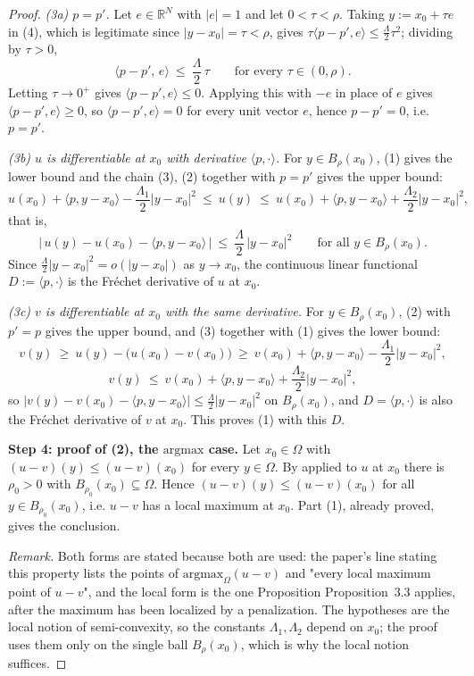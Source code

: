 \begin{proof}
\emph{(3a) $p=p'$.} Let $e\in\mathbb R^{N}$ with $|e|=1$ and let $0<\tau<\rho$. Taking
$y:=x_0+\tau e$ in (4), which is legitimate since $|y-x_0|=\tau<\rho$, gives
$\tau\langle p-p',e\rangle\le\tfrac{\Lambda}{2}\tau^{2}$; dividing by $\tau>0$,
\[
 \langle p-p',\,e\rangle\ \le\ \frac{\Lambda}{2}\,\tau\qquad\text{for every }\tau\in(0,\rho).
\]
Letting $\tau\to0^{+}$ gives $\langle p-p',e\rangle\le0$. Applying this with $-e$ in place of
$e$ gives $\langle p-p',e\rangle\ge0$, so $\langle p-p',e\rangle=0$ for every unit vector
$e$, hence $p-p'=0$, i.e. $p=p'$.

\emph{(3b) $u$ is differentiable at $x_0$ with derivative $\langle p,\cdot\rangle$.} For
$y\in B_\rho(x_0)$, (1) gives the lower bound and the chain (3), (2) together with $p=p'$
gives the upper bound:
\[
 u(x_0)+\langle p,y-x_0\rangle-\frac{\Lambda_1}{2}|y-x_0|^{2}
 \ \le\ u(y)\ \le\ u(x_0)+\langle p,y-x_0\rangle+\frac{\Lambda_2}{2}|y-x_0|^{2},
\]
that is,
\[
 \big|\,u(y)-u(x_0)-\langle p,y-x_0\rangle\,\big|\ \le\ \frac{\Lambda}{2}\,|y-x_0|^{2}
 \qquad\text{for all }y\in B_\rho(x_0).
\]
Since $\tfrac{\Lambda}{2}|y-x_0|^{2}=o(|y-x_0|)$ as $y\to x_0$, the continuous linear
functional $D:=\langle p,\cdot\rangle$ is the Fr\'echet derivative of $u$ at $x_0$.

\emph{(3c) $v$ is differentiable at $x_0$ with the same derivative.} For $y\in B_\rho(x_0)$,
(2) with $p'=p$ gives the upper bound, and (3) together with (1) gives the lower bound:
\[
 v(y)\ \ge\ u(y)-\big(u(x_0)-v(x_0)\big)
   \ \ge\ v(x_0)+\langle p,y-x_0\rangle-\frac{\Lambda_1}{2}|y-x_0|^{2},
\]
\[
 v(y)\ \le\ v(x_0)+\langle p,y-x_0\rangle+\frac{\Lambda_2}{2}|y-x_0|^{2} ,
\]
so $\big|v(y)-v(x_0)-\langle p,y-x_0\rangle\big|\le\tfrac{\Lambda}{2}|y-x_0|^{2}$ on
$B_\rho(x_0)$, and $D=\langle p,\cdot\rangle$ is also the Fr\'echet derivative of $v$ at
$x_0$. This proves (1) with this $D$.

\medskip\noindent\textbf{Step 4: proof of (2), the $\mathrm{argmax}$ case.} Let
$x_0\in\Omega$ with $(u-v)(y)\le(u-v)(x_0)$ for every $y\in\Omega$. By
 applied to $u$ at $x_0$ there is $\rho_0>0$ with
$B_{\rho_0}(x_0)\subseteq\Omega$. Hence $(u-v)(y)\le(u-v)(x_0)$ for all
$y\in B_{\rho_0}(x_0)$, i.e. $u-v$ has a local maximum at $x_0$. Part (1), already proved,
gives the conclusion.

\medskip\noindent\emph{Remark.} Both forms are stated because both are used: the paper's
line stating this property lists the points of $\mathrm{argmax}_\Omega(u-v)$ and "every local
maximum point of $u-v$", and the local form is the one Proposition Proposition~3.3 applies, after
the maximum has been localized by a penalization. The hypotheses are the local notion of
semi-convexity, so the constants $\Lambda_1,\Lambda_2$ depend on $x_0$; the proof uses them
only on the single ball $B_\rho(x_0)$, which is why the local notion suffices.
\end{proof}
